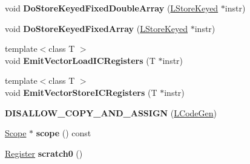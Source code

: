 \begin{DoxyCompactItemize}
\item 
void {\bfseries Do\+Store\+Keyed\+Fixed\+Double\+Array} (\hyperlink{classv8_1_1internal_1_1_l_store_keyed}{L\+Store\+Keyed} $\ast$instr)\hypertarget{classv8_1_1internal_1_1_l_code_gen_af87a3bb48b2b2ce3880ca8aacf62b397}{}\label{classv8_1_1internal_1_1_l_code_gen_af87a3bb48b2b2ce3880ca8aacf62b397}

\item 
void {\bfseries Do\+Store\+Keyed\+Fixed\+Array} (\hyperlink{classv8_1_1internal_1_1_l_store_keyed}{L\+Store\+Keyed} $\ast$instr)\hypertarget{classv8_1_1internal_1_1_l_code_gen_a126ac600bb5f30c98bef6e57a096d9a9}{}\label{classv8_1_1internal_1_1_l_code_gen_a126ac600bb5f30c98bef6e57a096d9a9}

\item 
{\footnotesize template$<$class T $>$ }\\void {\bfseries Emit\+Vector\+Load\+I\+C\+Registers} (T $\ast$instr)\hypertarget{classv8_1_1internal_1_1_l_code_gen_a31e396d22475d9c9dec1ac0e5030380a}{}\label{classv8_1_1internal_1_1_l_code_gen_a31e396d22475d9c9dec1ac0e5030380a}

\item 
{\footnotesize template$<$class T $>$ }\\void {\bfseries Emit\+Vector\+Store\+I\+C\+Registers} (T $\ast$instr)\hypertarget{classv8_1_1internal_1_1_l_code_gen_a84c9b0e87f89361233a5c74e43d689cb}{}\label{classv8_1_1internal_1_1_l_code_gen_a84c9b0e87f89361233a5c74e43d689cb}

\item 
{\bfseries D\+I\+S\+A\+L\+L\+O\+W\+\_\+\+C\+O\+P\+Y\+\_\+\+A\+N\+D\+\_\+\+A\+S\+S\+I\+GN} (\hyperlink{classv8_1_1internal_1_1_l_code_gen}{L\+Code\+Gen})\hypertarget{classv8_1_1internal_1_1_l_code_gen_a475eb7b3d7738263ae865905cf36b985}{}\label{classv8_1_1internal_1_1_l_code_gen_a475eb7b3d7738263ae865905cf36b985}

\item 
\hyperlink{classv8_1_1internal_1_1_scope}{Scope} $\ast$ {\bfseries scope} () const \hypertarget{classv8_1_1internal_1_1_l_code_gen_a2b85c964ccc4e59f50d49d19b0ed5ce0}{}\label{classv8_1_1internal_1_1_l_code_gen_a2b85c964ccc4e59f50d49d19b0ed5ce0}

\item 
\hyperlink{structv8_1_1internal_1_1_register}{Register} {\bfseries scratch0} ()\hypertarget{classv8_1_1internal_1_1_l_code_gen_a9ebee5eebe5fb0c13a6830fc3a0d96d5}{}\label{classv8_1_1internal_1_1_l_code_gen_a9ebee5eebe5fb0c13a6830fc3a0d96d5}


\end{DoxyCompactItemize}
